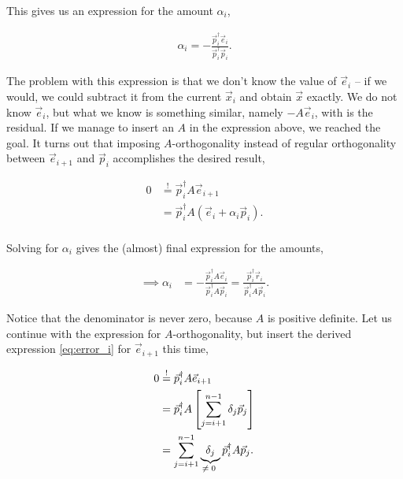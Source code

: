 \documentclass{article}
\theoremstyle{plain} %
\theoremstyle{convention} %
\theoremstyle{remark} %
\numberwithin{equation}{section}
\begin{document}
This gives us an expression for the amount $\alpha_i$,

\begin{align*}
    \alpha_i = - \frac{ \vec{p}_i^{\dagger} \vec{e}_{i} }{ \vec{p}_i^{\dagger} \vec{p}_i }.
\end{align*}

The problem with this expression is that we don't know the value of $\vec{e}_i$ -- if we would, we could subtract it from the current $\vec{x}_i$ and obtain $\vec{x}$ exactly. We do not know $\vec{e}_i$, but what we know is something similar, namely $-A \vec{e}_i$, with is the residual. If we manage to insert an $A$ in the expression above, we reached the goal. It turns out that imposing $A$-orthogonality instead of regular orthogonality between $\vec{e}_{i+1}$ and $\vec{p}_i$ accomplishes the desired result\footnotemark,

\begin{align*}
    0 &\stackrel{!}{=} \vec{p}_i^{\dagger} A \vec{e}_{i+1} \\
                    &= \vec{p}_i^{\dagger} A ( \vec{e}_{i} + \alpha_i \vec{p}_i ). \\
\end{align*}


Solving for $\alpha_i$ gives the (almost) final expression for the amounts,

\begin{align}
      \implies         \alpha_i &= - \frac{ \vec{p}_i^{\dagger} A \vec{e}_{i} }{ \vec{p}_i^{\dagger} A \vec{p}_i } = \frac{ \vec{p}_i^{\dagger} \vec{r}_{i} }{ \vec{p}_i^{\dagger} A \vec{p}_i }. \label{eq:cgne:alpha_pre}
\end{align}

Notice that the denominator is never zero, because $A$ is positive definite. Let us continue with the expression for $A$-orthogonality, but insert the derived expression \eqref{eq:error_i} for $\vec{e}_{i+1}$ this time,

\begin{align*}
    0 &\stackrel{!}{=} \vec{p}_i^{\dagger} A \vec{e}_{i+1} \\
                    &= \vec{p}_i^{\dagger} A \left[ \sum_{j=i+1}^{n-1} \delta_j \vec{p}_j \right] \\
                    &= \sum_{j=i+1}^{n-1} \underbrace{ \delta_j }_{\text{\makebox[0pt]{$\neq 0$} }} \vec{p}_i^{\dagger} A \vec{p}_j.
\end{align*}
\end{document}
